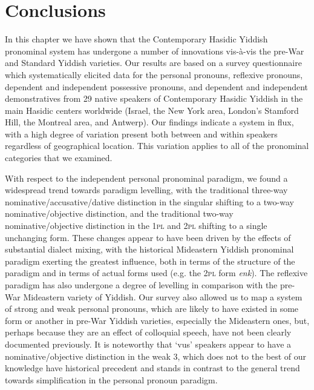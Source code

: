 \documentclass[output=paper, hidelinks]{langscibook}
\begin{document}
\section{Conclusions}\label{sec:conclusions}

In this chapter we have shown that the Contemporary Hasidic Yiddish pronominal system has undergone a number of innovations vis-\`a-vis the pre-War and Standard Yiddish varieties. Our results are based on a survey questionnaire which systematically elicited data for the personal pronouns, reflexive pronouns, dependent and independent possessive pronouns, and dependent and independent demonstratives from 29 native speakers of Contemporary Hasidic Yiddish in the main Hasidic centers worldwide (Israel, the New York area, London's Stamford Hill, the Montreal area, and Antwerp). Our findings indicate a system in flux, with a high degree of variation present both between and within speakers regardless of geographical location. This variation applies to all of the pronominal categories that we examined. 

With respect to the independent personal pronominal paradigm, we found a widespread trend towards paradigm levelling, with the traditional three-way nominative/accusative/dative distinction in the singular shifting to a two-way nominative/objec\-tive distinction, and the traditional two-way nominative/objec\-tive distinction in the 1\textsc{pl} and 2\textsc{pl} shifting to a single unchanging form. These changes appear to have been driven by the effects of substantial dialect mixing, with the historical Mideastern Yiddish pronominal paradigm exerting the greatest influence, both in terms of the structure of the paradigm and in terms of actual forms used (e.g. the 2\textsc{pl} form \textit{enk}). The reflexive paradigm has also undergone a degree of levelling in comparison with the pre-War Mideastern variety of Yiddish. Our survey also allowed us to map a system of strong and weak personal pronouns, which are likely to have existed in some form or another in pre-War Yiddish varieties, especially the Mideastern ones, but, perhaps because they are an effect of colloquial speech, have not been clearly documented previously. It is noteworthy that `vus' speakers appear to have a nominative/objective distinction in the weak 3, which does not to the best of our knowledge have historical precedent and stands in contrast to the general trend towards simplification in the personal pronoun paradigm.
\end{document}
